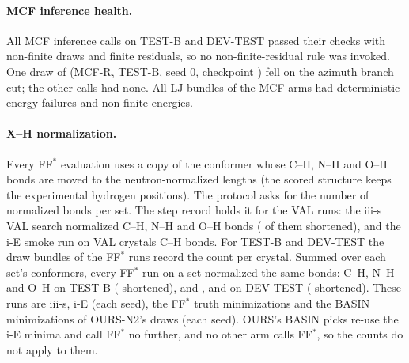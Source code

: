 \documentclass[journal=acsodf,manuscript=article]{achemso}
\begin{document}
\paragraph{MCF inference health.} All \svMcfCalls{} MCF inference calls on TEST-B and DEV-TEST
passed their checks with \svMcfNonfiniteDraws{} non-finite draws and finite residuals, so no
non-finite-residual rule was invoked. One draw of \svBranchOf{} (MCF-R, TEST-B, seed 0,
checkpoint \svBranchCkpt) fell on the azimuth branch cut; the other \svBranchClean{} calls had
none. All \svLJBundles{} LJ bundles of the MCF arms had \svLJDetFail{} deterministic energy
failures and \svLJNonfinite{} non-finite energies.

\paragraph{X--H normalization.} Every FF$^\ast$ evaluation uses a copy of the conformer whose
C--H, N--H and O--H bonds are moved to the neutron-normalized lengths\cite{allen2010xh} (the
scored structure keeps
the experimental hydrogen positions). The protocol asks for the number of normalized bonds per
set. The step record holds it for the VAL runs: the iii-s VAL search normalized \svXHCH{}
C--H, \svXHNH{} N--H and \svXHOH{} O--H bonds (\svXHShort{} of them shortened), and the i-E smoke
run on \svXHIeN{} VAL crystals \svXHIeCH{} C--H bonds. For TEST-B and DEV-TEST the draw bundles
of the FF$^\ast$ runs record the count per crystal. Summed over each set's conformers, every
FF$^\ast$ run on a set normalized the same bonds: \svXHSetCH{} C--H, \svXHSetNH{} N--H and
\svXHSetOH{} O--H on TEST-B (\svXHSetShort{} shortened), and \svXHSetCHDev{}, \svXHSetNHDev{} and
\svXHSetOHDev{} on DEV-TEST (\svXHSetShortDev{} shortened). These runs are iii-s, i-E (each
seed), the FF$^\ast$ truth minimizations and the BASIN minimizations of OURS-N2's draws (each
seed). OURS's BASIN picks re-use the i-E minima and call FF$^\ast$ no further, and no other arm
calls FF$^\ast$, so the counts do not apply to them.
\end{document}
